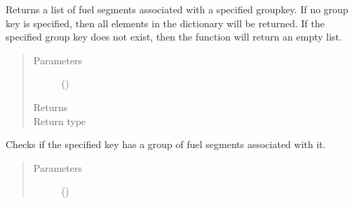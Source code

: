 \documentclass[letterpaper,10pt,openany,oneside,english]{sphinxmanual}
\begin{document}
\begin{fulllineitems}
\begin{fulllineitems}
\begin{quote}
\begin{description}
\end{description}\end{quote}

\end{fulllineitems}


\begin{fulllineitems}
\label{\detokenize{support_rst/fuelsegmentsgroups:fuelsegmentsgroups.FuelSegmentsGroups.GetFuelSegments}}
Returns a list of fuel segments associated with a specified groupkey.
If no group key is specified, then all elements in the dictionary
will be returned. If the specified group key does not exist, then the
function will return an empty list.
\begin{quote}\begin{description}
\item[{Parameters}] \leavevmode
{} () \textendash{} 

\item[{Returns}] \leavevmode
{}

\item[{Return type}] \leavevmode
{}

\end{description}\end{quote}

\end{fulllineitems}


\begin{fulllineitems}
\label{\detokenize{support_rst/fuelsegmentsgroups:fuelsegmentsgroups.FuelSegmentsGroups.HasGroup}}
Checks if the specified key has a group of fuel segments associated
with it.
\begin{quote}\begin{description}
\item[{Parameters}] \leavevmode
{} () \textendash{} 


\end{description}
\end{quote}
\end{fulllineitems}
\end{fulllineitems}
\end{document}
